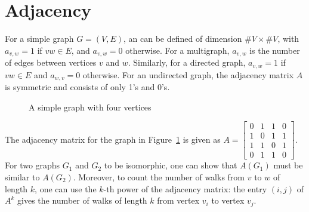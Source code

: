 \section{Adjacency}

For a simple graph $G = (V,E)$, an  can be defined of dimension $\# V \times \# V$, with $a_{v,w} = 1$ if $vw \in E$, and $a_{v,w} = 0$ otherwise. For a multigraph, $a_{v,w}$ is the number of edges between vertices $v$ and $w$. Similarly, for a directed graph, $a_{v,w} = 1$ if $vw \in E$ and $a_{w,v} = 0$ otherwise. For an undirected graph, the adjacency matrix $A$ is symmetric and consists of only 1's and 0's. 

\begin{figure}[h]
    \centering
    \caption{A simple graph with four vertices}
    \label{fig:graph_example}
\end{figure}
The adjacency matrix for the graph in Figure~\ref{fig:graph_example} is given as
$
A =
\begin{bmatrix}
0 & 1 & 1 & 0 \\
1 & 0 & 1 & 1 \\
1 & 1 & 0 & 1 \\
0 & 1 & 1 & 0
\end{bmatrix}
$. For two graphs $G_{1}$ and $G_{2}$ to be isomorphic, one can show that $A(G_{1})$ must be similar to $A(G_{2})$. Moreover, to count the number of walks from $v$ to $w$ of length $k$, one can use the $k$-th power of the adjacency matrix: the entry $(i,j)$ of $A^{k}$ gives the number of walks of length $k$ from vertex $v_{i}$ to vertex $v_{j}$.